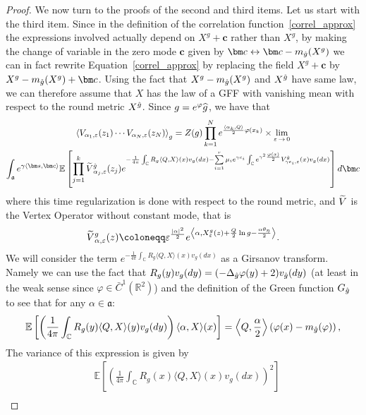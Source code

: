 \documentclass[10pt]{amsart}
\theoremstyle{definition}\newtheorem{defi}[theo]{Definition}\newtheorem{rema}[theo]{Remark}\newtheorem{exam}[theo]{Example}\newtheorem{exem}[theo]{Example}\newtheorem{nota}[theo]{Notation}
\renewcommand{\tilde}{\widetilde}
\newcommand{\frka}{\mathfrak{a}}
\newcommand{\C}{\mathbb{C}}
\newcommand{\R}{\mathbb{R}}
\newcommand{\E}{\mathbb{E}}
\newcommand{\ps}[1]{\langle #1 \rangle}
\newcommand*\eps{\varepsilon}
\let\oldtilde\tilde
\renewcommand*{\tilde}[1]{\mathchoice{\widetilde{#1}}{\widetilde{#1}}{\oldtilde{#1}}{\oldtilde{#1}}}
\let\oldhat\hat
\renewcommand*{\hat}[1]{\mathchoice{\widehat{#1}}{\widehat{#1}}{\oldhat{#1}}{\oldhat{#1}}}
\begin{document}
\begin{proof}
We now turn to the proofs of the second and third items. Let us start with the third item. Since in the definition of the correlation function~\eqref{correl_approx} the expressions involved actually depend on $X^g +\bm c$ rather than $X^g$, by making the change of variable in the zero mode $\bm c$ given by $\bm c\leftrightarrow \bm c-m_{\hat g}(X^g)$ we can in fact rewrite Equation~\eqref{correl_approx} by replacing the field $X^g+\bm c$ by $X^{g}-m_{\hat g}(X^g) +\bm c$. Using the fact that $X^g-m_{\hat g}(X^g)$ and $X^{\hat g}$ have same law, we can therefore assume that $X$ has the law of a GFF with vanishing mean with respect to the round metric $X^{\hat g}$. Since $g=e^{\varphi} \hat{g}$, we have that
\begin{multline*}
\left\langle V_{\alpha_1,\eps}(z_1) \cdots V_{\alpha_N,\eps}(z_N) \right\rangle_g = Z(g)\prod_{k=1}^N e^{\frac{\ps{\alpha_k,Q}}{2}\varphi(x_k)} \times \underset{\eps\,\to\,0}{\lim} \\
\int_{\frka} e^{\gamma\ps{\bm s,\bm c}} \E \left [\prod_{j=1}^k \tilde V^{\hat g}_{\alpha_j,\eps}(z_j) e^{-\frac{1}{4 \pi} \int_{\C} R_g \left\langle Q, X \right\rangle (x) v_g(dx) - \sum\limits_{i=1}^{r} \mu_i e^{\gamma c_i} \int_{\C} e^{ \gamma^2 \frac{\varphi(x)}{2} } V^{\hat g}_{\gamma e_i,\eps}(x) v_g(dx) } \right] d\bm c
\end{multline*}
where this time regularization is done with respect to the round metric, and $\tilde V$ is the Vertex Operator without constant mode, that is
\[
\tilde V^g_{\alpha,\eps}(z)\coloneqq \eps^{ \frac{|\alpha|^2}{2}} e^{ \left\langle\alpha, X^g_\eps(z) + \frac Q2\ln g-\frac{\alpha\theta_{\eta}}2\right\rangle}.
\]
We will consider the term $e^{-\frac{1}{4 \pi} \int_{\C} R_g \langle Q, X \rangle (x) v_g(dx)}$ as a Girsanov transform. Namely we can use the fact that $R_g(y)v_g(dy)=(-\Delta_{\hat{g}} \varphi(y) +2)v_{\hat g}(dy)$ (at least in the weak sense since $\varphi\in \bar{C}^1(\R^2)$) and the definition of the Green function $G_{\hat g}$ to see that for any $\alpha\in\frka$:
\begin{equation*}
\E \left [\left(\frac{1}{4\pi}\int_{\C} R_g(y) \langle Q, X \rangle (y) v_g(dy) \right) \langle \alpha, X\rangle (x) \right]= \left\langle Q,\frac\alpha2 \right\rangle \left(\varphi(x) -m_{\hat g}(\varphi)\right),
\end{equation*}
The variance of this expression is given by
\begin{align*}
& \E \left [\left (\frac{1}{4\pi} \int_{\C} R_g(x) \langle Q, X \rangle (x) v_g(dx) \right)^2 \right] \\

\end{align*}
\end{proof}
\end{document}
